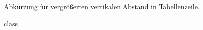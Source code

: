 \begin{macro}{\ls}
Abkürzung für vergrößerten vertikalen Abstand in Tabellenzeile.
\begin{MacroCode}{class}
\DeclareExpandableDocumentCommand \ls { } {\addlinespace[1.5ex]}

\end{MacroCode}
\end{macro}
